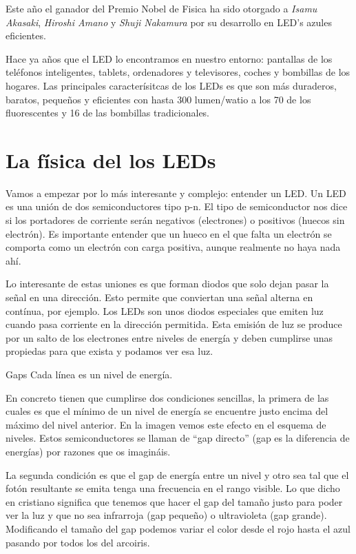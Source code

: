 
Este año el ganador del Premio Nobel de Fisica ha sido otorgado a
\emph{Isamu Akasaki}, \emph{Hiroshi Amano} y \emph{Shuji Nakamura} por
su desarrollo en LED's azules eficientes.

Hace ya años que el LED lo encontramos en nuestro entorno: pantallas
de los teléfonos inteligentes, tablets, ordenadores y televisores,
coches y bombillas de los hogares. Las principales caracterísitcas de
los LEDs es que son más duraderos, baratos, pequeños y eficientes con
hasta 300 lumen/watio a los 70 de los fluorescentes y 16 de las
bombillas tradicionales.

\section{La física del los LEDs}

Vamos a empezar por lo más interesante y complejo: entender un LED. Un LED es una unión de dos semiconductores tipo p-n. El tipo de semiconductor nos dice si los portadores de corriente serán negativos (electrones) o positivos (huecos sin electrón). Es importante entender que un hueco en el que falta un electrón se comporta como un electrón con carga positiva, aunque realmente no haya nada ahí.

Lo interesante de estas uniones es que forman diodos que solo dejan pasar la señal en una dirección. Esto permite que conviertan una señal alterna en contínua, por ejemplo. Los LEDs son unos diodos especiales que emiten luz cuando pasa corriente en la dirección permitida. Esta emisión de luz se produce por un salto de los electrones entre niveles de energía y deben cumplirse unas propiedas para que exista y podamos ver esa luz.

Gaps
Cada línea es un nivel de energía.

En concreto tienen que cumplirse dos condiciones sencillas, la primera de las cuales es que el mínimo de un nivel de energía se encuentre justo encima del máximo del nivel anterior. En la imagen vemos este efecto en el esquema de niveles. Estos semiconductores se llaman de “gap directo” (gap es la diferencia de energías) por razones que os imagináis.

La segunda condición es que el gap de energía entre un nivel y otro sea tal que el fotón resultante se emita tenga una frecuencia en el rango visible. Lo que dicho en cristiano significa que tenemos que hacer el gap del tamaño justo para poder ver la luz y que no sea infrarroja (gap pequeño) o ultravioleta (gap grande). Modificando el tamaño del gap podemos variar el color desde el rojo hasta el azul pasando por todos los del arcoiris.

